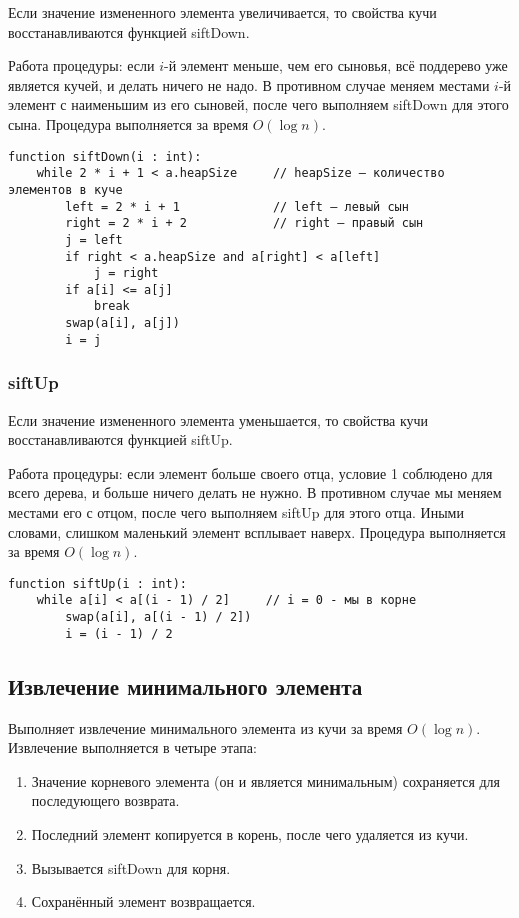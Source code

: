 Если значение измененного элемента увеличивается, то свойства кучи восстанавливаются функцией siftDown.

Работа процедуры: если $i$-й элемент меньше, чем его сыновья, всё поддерево уже является кучей, и делать ничего не надо.
В противном случае меняем местами $i$-й элемент с наименьшим из его сыновей, после чего выполняем siftDown для этого сына.
Процедура выполняется за время $O(\log n)$.

\begin{verbatim}
function siftDown(i : int):
    while 2 * i + 1 < a.heapSize     // heapSize — количество элементов в куче
        left = 2 * i + 1             // left — левый сын
        right = 2 * i + 2            // right — правый сын
        j = left
        if right < a.heapSize and a[right] < a[left]
            j = right
        if a[i] <= a[j]
            break
        swap(a[i], a[j])
        i = j
\end{verbatim}

\subsubsection{siftUp}

Если значение измененного элемента уменьшается, то свойства кучи восстанавливаются функцией siftUp.

Работа процедуры: если элемент больше своего отца, условие 1 соблюдено для всего дерева, и больше ничего делать не нужно.
В противном случае мы меняем местами его с отцом, после чего выполняем siftUp для этого отца.
Иными словами, слишком маленький элемент всплывает наверх.
Процедура выполняется за время $O(\log n)$.

\begin{verbatim}
function siftUp(i : int):
    while a[i] < a[(i - 1) / 2]     // i = 0 - мы в корне
        swap(a[i], a[(i - 1) / 2])
        i = (i - 1) / 2
\end{verbatim}

\subsection{Извлечение минимального элемента}

Выполняет извлечение минимального элемента из кучи за время $O(\log n)$.
Извлечение выполняется в четыре этапа:

\begin{enumerate}
    \item Значение корневого элемента (он и является минимальным) сохраняется для последующего возврата.
    \item Последний элемент копируется в корень, после чего удаляется из кучи.
    \item Вызывается siftDown для корня.
    \item Сохранённый элемент возвращается.
\end{enumerate}

